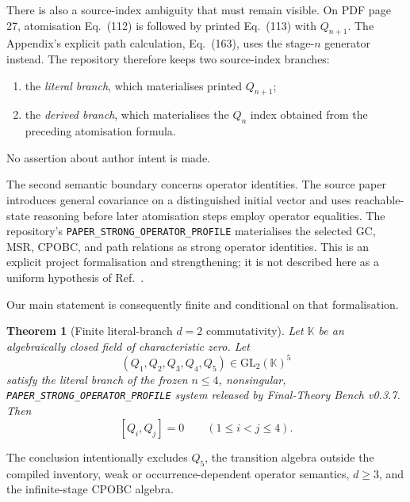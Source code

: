 \documentclass[11pt]{article}
\newtheorem{theorem}{Theorem}
\theoremstyle{remark}
\theoremstyle{plain}
\newcommand{\KK}{\mathbb{K}}
\newcommand{\GL}{\mathrm{GL}}
\newcommand{\artifact}[1]{\texttt{\small #1}}
\begin{document}
There is also a source-index ambiguity that must remain visible.  On PDF
page 27, atomisation Eq.\ (112) is followed by printed Eq.\ (113) with
\(Q_{n+1}\).  The Appendix's explicit path calculation, Eq.\ (163), uses
the stage-\(n\) generator instead.  The repository therefore keeps two
source-index branches:
\begin{enumerate}[label=(\roman*)]
  \item the \emph{literal branch}, which materialises printed \(Q_{n+1}\);
  \item the \emph{derived branch}, which materialises the \(Q_n\) index
        obtained from the preceding atomisation formula.
\end{enumerate}
No assertion about author intent is made.

The second semantic boundary concerns operator identities.  The source
paper introduces general covariance on a distinguished initial vector and
uses reachable-state reasoning before later atomisation steps employ
operator equalities.  The repository's
\artifact{PAPER\_STRONG\_OPERATOR\_PROFILE} materialises the selected GC,
MSR, CPOBC, and path relations as strong operator identities.  This is an
explicit project formalisation and strengthening; it is not described here
as a uniform hypothesis of Ref.\ \cite{SrivastavaSurya2026}.

Our main statement is consequently finite and conditional on that
formalisation.

\begin{theorem}[Finite literal-branch \(d=2\) commutativity]
\label{thm:main}
Let \(\KK\) be an algebraically closed field of characteristic zero.  Let
\[
  (Q_1,Q_2,Q_3,Q_4,Q_5)\in\GL_2(\KK)^5
\]
satisfy the literal branch of the frozen \(n\leq4\), nonsingular,
\artifact{PAPER\_STRONG\_OPERATOR\_PROFILE} system released by
Final-Theory Bench v0.3.7.  Then
\[
  [Q_i,Q_j]=0 \qquad (1\leq i<j\leq4).
\]
\end{theorem}

The conclusion intentionally excludes \(Q_5\), the transition algebra
outside the compiled inventory, weak or occurrence-dependent operator
semantics, \(d\geq3\), and the infinite-stage CPOBC algebra.
\end{document}
